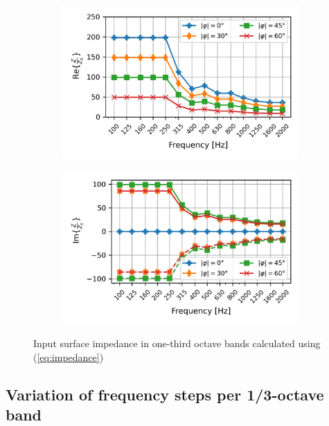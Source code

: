 \begin{figure}[H]
	\centering
	\begin{subfigure}[b]{0.8\textwidth}
		\centering
		\includegraphics{fig/chap4/impedance/impedance_real.png}
	\end{subfigure}
	\begin{subfigure}[b]{0.8\textwidth}
		\centering
		\includegraphics{fig/chap4/impedance/impedance_imag.png}
	\end{subfigure}
	\caption{Input surface impedance in one-third octave bands calculated using (\ref{eq:impedance})}
\end{figure}


\subsection{Variation of frequency steps per 1/3-octave band}